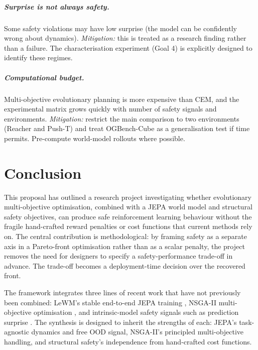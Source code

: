 \documentclass[a4paper,twoside,12pt]{report}
\begin{document}
\paragraph{Surprise is not always safety.} Some safety violations may have low surprise (the model can be confidently wrong about dynamics). \emph{Mitigation:} this is treated as a research finding rather than a failure. The characterisation experiment (Goal 4) is explicitly designed to identify these regimes.

\paragraph{Computational budget.} Multi-objective evolutionary planning is more expensive than CEM, and the experimental matrix grows quickly with number of safety signals and environments. \emph{Mitigation:} restrict the main comparison to two environments (Reacher and Push-T) and treat OGBench-Cube as a generalisation test if time permits. Pre-compute world-model rollouts where possible.

\chapter{Conclusion}\label{ch:conclusion}

This proposal has outlined a research project investigating whether evolutionary multi-objective optimisation, combined with a JEPA world model and structural safety objectives, can produce safe reinforcement learning behaviour without the fragile hand-crafted reward penalties or cost functions that current methods rely on. The central contribution is methodological: by framing safety as a separate axis in a Pareto-front optimisation rather than as a scalar penalty, the project removes the need for designers to specify a safety-performance trade-off in advance. The trade-off becomes a deployment-time decision over the recovered front.

The framework integrates three lines of recent work that have not previously been combined: LeWM's stable end-to-end JEPA training \citep{maes2026lewm}, NSGA-II multi-objective optimisation \citep{deb2002nsga2}, and intrinsic-model safety signals such as prediction surprise \citep{garrido2025intuitive}. The synthesis is designed to inherit the strengths of each: JEPA's task-agnostic dynamics and free OOD signal, NSGA-II's principled multi-objective handling, and structural safety's independence from hand-crafted cost functions.
\end{document}
